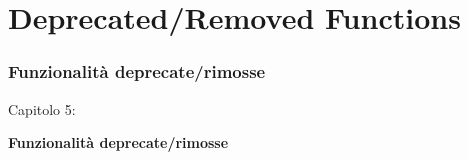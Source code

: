 %

\section{Deprecated/Removed Functions}
\begin{frame}[fragile]
	\frametitle{Funzionalità deprecate/rimosse}

	\begin{center}\huge{Capitolo 5:}\end{center}
	\begin{center}\huge{\color{typo3darkgrey}\textbf{Funzionalità deprecate/rimosse}}\end{center}

\end{frame}


